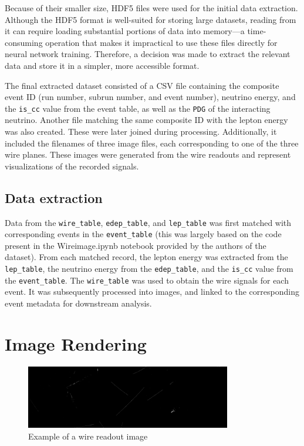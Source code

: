 \documentclass{pracalicmgr}
\begin{document}
Because of their smaller size, HDF5 files were used for the initial data extraction. Although the HDF5 format is well-suited for storing large datasets, reading from it can require loading substantial portions of data into memory—a time-consuming operation that makes it impractical to use these files directly for neural network training. Therefore, a decision was made to extract the relevant data and store it in a simpler, more accessible format.

The final extracted dataset consisted of a CSV file containing the composite event ID (run number, subrun number, and event number), neutrino energy, and the \texttt{is\_cc} value from the event table, as well as the \texttt{PDG} of the interacting neutrino. Another file matching the same composite ID with the lepton energy was also created. These were later joined during processing. Additionally, it included the filenames of three image files, each corresponding to one of the three wire planes. These images were generated from the wire readouts and represent visualizations of the recorded signals.

\subsection{Data extraction}

Data from the \texttt{wire\_table}, \texttt{edep\_table}, and \texttt{lep\_table} was first matched with corresponding events in the \texttt{event\_table} (this was largely based on the code present in the Wireimage.ipynb notebook provided by the authors of the dataset). From each matched record, the lepton energy was extracted from the \texttt{lep\_table}, the neutrino energy from the \texttt{edep\_table}, and the \texttt{is\_cc} value from the \texttt{event\_table}. The \texttt{wire\_table} was used to obtain the wire signals for each event. It was subsequently processed into images, and linked to the corresponding event metadata for downstream analysis.

\section{Image Rendering}

\begin{figure}[H]
    \centering
    \includegraphics[width=0.8\textwidth]{src/with_flag_58.png}
    \caption{Example of a wire readout image}
\end{figure}
\end{document}
